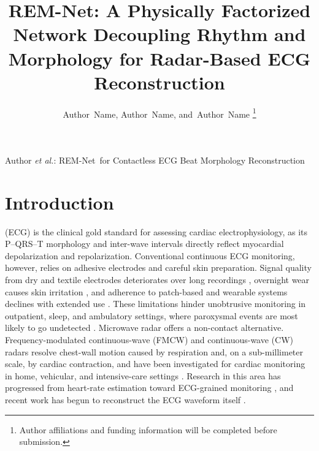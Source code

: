 \documentclass[lettersize,journal]{IEEEtran}
\newcommand{\remnet}{REM-Net\xspace}
\begin{document}
\title{\remnet: A Physically Factorized Network Decoupling Rhythm and Morphology for Radar-Based ECG Reconstruction}

\author{Author~Name,
        Author~Name,
        and~Author~Name%
\thanks{Author affiliations and funding information will be completed before submission.}
}

%
{Author \MakeLowercase{\textit{et al.}}: \remnet\ for Contactless ECG Beat Morphology Reconstruction}

\maketitle

\begin{abstract}

\end{abstract}

\begin{IEEEkeywords}

\end{IEEEkeywords}

\section{Introduction}
 (ECG) is the clinical gold standard for assessing cardiac electrophysiology, as its P–QRS–T morphology and inter-wave intervals directly reflect myocardial depolarization and repolarization. Conventional continuous ECG monitoring, however, relies on adhesive electrodes and careful skin preparation. Signal quality from dry and textile electrodes deteriorates over long recordings \cite{joutsen2024dryelectrode}, overnight wear causes skin irritation \cite{fontana2019textile}, and adherence to patch-based and wearable systems declines with extended use \cite{hughes2023wearable}. These limitations hinder unobtrusive monitoring in outpatient, sleep, and ambulatory settings, where paroxysmal events are most likely to go undetected \cite{zhang2023overview}. Microwave radar offers a non-contact alternative. Frequency-modulated continuous-wave (FMCW) and continuous-wave (CW) radars resolve chest-wall motion caused by respiration and, on a sub-millimeter scale, by cardiac contraction, and have been investigated for cardiac monitoring in home, vehicular, and intensive-care settings \cite{zhang2023overview,wuNonintrusiveHumanVital2024,kouhalvandi2025advances,hassanpourContactlessVitalSign2025a}. Research in this area has progressed from heart-rate estimation toward ECG-grained monitoring \cite{wangECGgrainedCardiacMonitoring2022c,xuCardiacWaveMmWavebasedScheme2021,chenmmwave}, and recent work has begun to reconstruct the ECG waveform itself \cite{airecg,radarode,radarodemt,rssrnet,statespace,11398845}.
\end{document}

